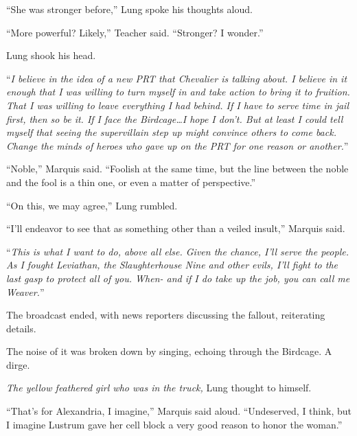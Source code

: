 ``She was stronger before,'' Lung spoke his thoughts aloud.



``More powerful?  Likely,'' Teacher said.  ``Stronger?  I wonder.''



Lung shook his head.



``\emph{I believe in the idea of a new PRT that Chevalier is talking about.  I believe in it enough that I was willing to turn myself in and take action to bring it to fruition.  That I was willing to leave everything I had behind.  If I have to serve time in jail first, then so be it.  If I face the Birdcage\ldots I hope I don't.  But at least I could tell myself that seeing the supervillain step up might convince others to come back.  Change the minds of heroes who gave up on the PRT for one reason or another.}''



``Noble,'' Marquis said.  ``Foolish at the same time, but the line between the noble and the fool is a thin one, or even a matter of perspective.''



``On this, we may agree,'' Lung rumbled.



``I'll endeavor to see that as something other than a veiled insult,'' Marquis said.



``\emph{This is what I want to do, above all else.  Given the chance, I'll serve the people.  As I fought Leviathan, the Slaughterhouse Nine and other evils, I'll fight to the last gasp to protect all of you.  When-  \ldotsWhen and if I do take up the job, you can call me Weaver.}''



The broadcast ended, with news reporters discussing the fallout, reiterating details.



The noise of it was broken down by singing, echoing through the Birdcage.  A dirge.



\emph{The yellow feathered girl who was in the truck, }Lung thought to himself.



``That's for Alexandria, I imagine,'' Marquis said aloud.  ``Undeserved, I think, but I imagine Lustrum gave her cell block a very good reason to honor the woman.''



